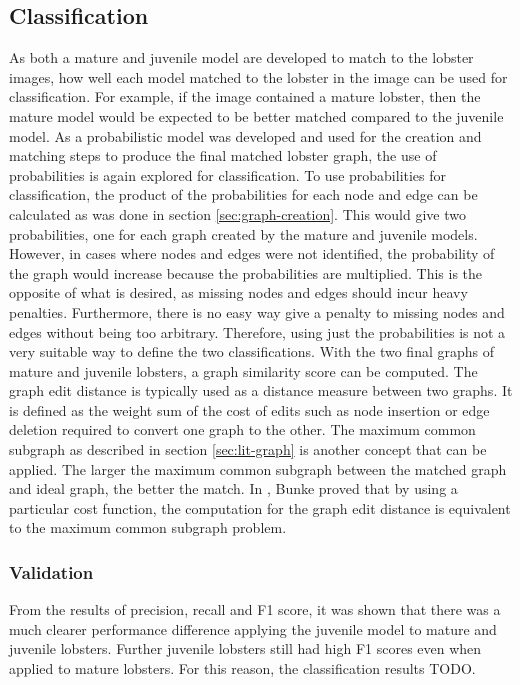 \subsection{Classification}
As both a mature and juvenile model are developed to match to the lobster images, how well each model matched to the lobster in the image can be used for classification. For example, if the image contained a mature lobster, then the mature model would be expected to be better matched compared to the juvenile model. 
\n
As a probabilistic model was developed and used for the creation and matching steps to produce the final matched lobster graph, the use of probabilities is again explored for classification. To use probabilities for classification, the product of the probabilities for each node and edge can be calculated as was done in section \ref{sec:graph-creation}. This would give two probabilities, one for each graph created by the mature and juvenile models. However, in cases where nodes and edges were not identified, the probability of the graph would increase because the probabilities are multiplied. This is the opposite of what is desired, as missing nodes and edges should incur heavy penalties. Furthermore, there is no easy way give a penalty to missing nodes and edges without being too arbitrary. Therefore, using just the probabilities is not a very suitable way to define the two classifications.
\n
With the two final graphs of mature and juvenile lobsters, a graph similarity score can be computed. The graph edit distance is typically used as a distance measure between two graphs. It is defined as the weight sum of the cost of edits such as node insertion or edge deletion required to convert one graph to the other. The maximum common subgraph as described in section \ref{sec:lit-graph} is another concept that can be applied. The larger the maximum common subgraph between the matched graph and ideal graph, the better the match. In \cite{graph-edit}, Bunke proved that by using a particular cost function, the computation for the graph edit distance is equivalent to the maximum common subgraph problem. 

\subsubsection{Validation}

From the results of precision, recall and F1 score, it was shown that there was a much clearer performance difference applying the juvenile model to mature and juvenile lobsters. Further juvenile lobsters still had high F1 scores even when applied to mature lobsters. For this reason, the classification results TODO.


